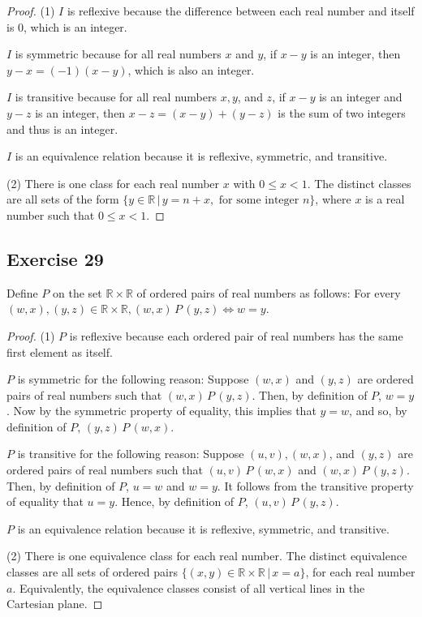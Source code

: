 \documentclass[14pt]{extarticle}
\newcommand{\R}{\mathbb{R}}
\begin{document}
\begin{proof}
(1) $I$ is reflexive because the difference between each real number and itself is 0, which is an integer.

$I$ is symmetric because for all real numbers $x$ and $y$, if \(x - y\) is an integer, then \(y - x = (-1)(x - y)\), 
which is also an integer.

$I$ is transitive because for all real numbers \(x, y\), and \(z\), if \(x - y\) is an integer and \(y - z\) is an 
integer, then \(x - z = (x - y) + (y - z)\) is the sum of two integers and thus is an integer.

$I$ is an equivalence relation because it is reflexive, symmetric, and transitive.

(2) There is one class for each real number $x$ with \(0 \leq x < 1\). The distinct classes are all sets of the form 
\(\{y \in \R \,|\, y = n + x, \text{ for some integer } n\}\), where $x$ is a real number such that \(0 \leq x < 1\).
\end{proof}

\subsection{Exercise 29}
Define $P$ on the set \(\R \times \R\) of ordered pairs of real numbers as follows: For every \((w, x), (y, z) \in \R 
\times \R, (w, x) \,P\, (y, z) \iff w = y\).

\begin{proof}
(1) $P$ is reflexive because each ordered pair of real numbers has the same first element as itself. 

$P$ is symmetric for the following reason: Suppose \((w, x)\) and \((y, z)\) are ordered pairs of real numbers such 
that \((w, x) \,P\, (y, z)\). Then, by definition of $P$, \(w = y\). Now by the symmetric property of equality, this 
implies that \(y = w\), and so, by definition of $P$, \((y, z) \,P\, (w, x)\).

$P$ is transitive for the following reason: Suppose \((u, v), (w, x)\), and \((y, z)\) are ordered pairs of real 
numbers such that \((u, v) \,P\, (w, x)\) and \((w, x) \,P\, (y, z)\). Then, by definition of $P$, \(u = w\) and 
\(w = y\). It follows from the transitive property of equality that \(u = y\). Hence, by definition of $P$, \((u, v) \,P\, (y, z)\).

$P$ is an equivalence relation because it is reflexive, symmetric, and transitive.

(2) There is one equivalence class for each real number. The distinct equivalence classes are all sets of ordered 
pairs \(\{(x, y) \in \R \times \R \,|\, x = a\}\), for each real number $a$. Equivalently, the equivalence classes 
consist of all vertical lines in the Cartesian plane.
\end{proof}
\end{document}
